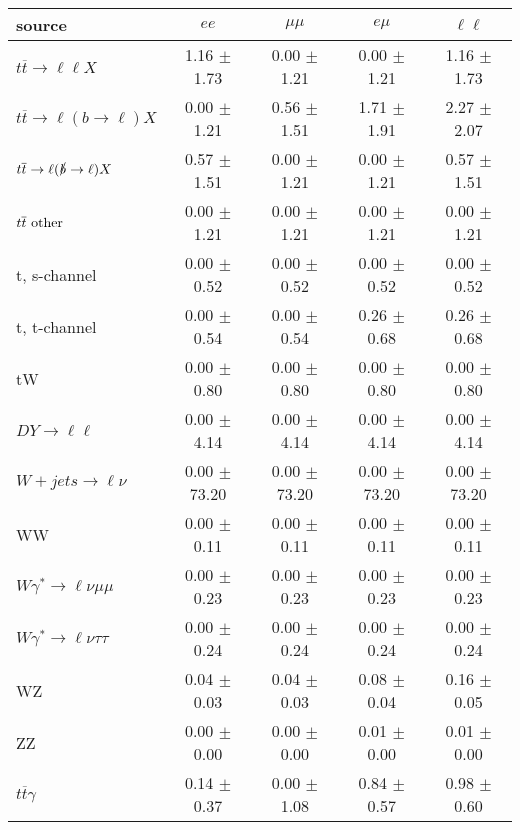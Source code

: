 \begin{tabular}{l|cccc} \hline\hline
source & $ee$ & $\mu\mu$ & $e\mu$ & $\ell\ell $ \\
\hline
$t\overline{t} \rightarrow \ell \ell X$ &  1.16 $\pm$  1.73 &  0.00 $\pm$  1.21 &  0.00 $\pm$  1.21 &  1.16 $\pm$  1.73 \\
$t\overline{t} \rightarrow \ell (b \rightarrow \ell) X$ &  0.00 $\pm$  1.21 &  0.56 $\pm$  1.51 &  1.71 $\pm$  1.91 &  2.27 $\pm$  2.07 \\
$t\overline{t} \rightarrow \ell (\slashed b \rightarrow \ell) X$ &  0.57 $\pm$  1.51 &  0.00 $\pm$  1.21 &  0.00 $\pm$  1.21 &  0.57 $\pm$  1.51 \\
        $t\overline{t}\ \rm{other}$ &  0.00 $\pm$  1.21 &  0.00 $\pm$  1.21 &  0.00 $\pm$  1.21 &  0.00 $\pm$  1.21 \\
\hline
                       t, s-channel &  0.00 $\pm$  0.52 &  0.00 $\pm$  0.52 &  0.00 $\pm$  0.52 &  0.00 $\pm$  0.52 \\
                       t, t-channel &  0.00 $\pm$  0.54 &  0.00 $\pm$  0.54 &  0.26 $\pm$  0.68 &  0.26 $\pm$  0.68 \\
                                 tW &  0.00 $\pm$  0.80 &  0.00 $\pm$  0.80 &  0.00 $\pm$  0.80 &  0.00 $\pm$  0.80 \\
\hline
         $DY \rightarrow \ell \ell$ &  0.00 $\pm$  4.14 &  0.00 $\pm$  4.14 &  0.00 $\pm$  4.14 &  0.00 $\pm$  4.14 \\
      $W+jets \rightarrow \ell \nu$ &  0.00 $\pm$ 73.20 &  0.00 $\pm$ 73.20 &  0.00 $\pm$ 73.20 &  0.00 $\pm$ 73.20 \\
                                 WW &  0.00 $\pm$  0.11 &  0.00 $\pm$  0.11 &  0.00 $\pm$  0.11 &  0.00 $\pm$  0.11 \\
\hline
$W\gamma^{*} \rightarrow \ell \nu \mu\mu$ &  0.00 $\pm$  0.23 &  0.00 $\pm$  0.23 &  0.00 $\pm$  0.23 &  0.00 $\pm$  0.23 \\
$W\gamma^{*} \rightarrow \ell \nu \tau\tau$ &  0.00 $\pm$  0.24 &  0.00 $\pm$  0.24 &  0.00 $\pm$  0.24 &  0.00 $\pm$  0.24 \\
                                 WZ &  0.04 $\pm$  0.03 &  0.04 $\pm$  0.03 &  0.08 $\pm$  0.04 &  0.16 $\pm$  0.05 \\
                                 ZZ &  0.00 $\pm$  0.00 &  0.00 $\pm$  0.00 &  0.01 $\pm$  0.00 &  0.01 $\pm$  0.00 \\
\hline
              $t\overline{t}\gamma$ &  0.14 $\pm$  0.37 &  0.00 $\pm$  1.08 &  0.84 $\pm$  0.57 &  0.98 $\pm$  0.60 \\

\end{tabular}
